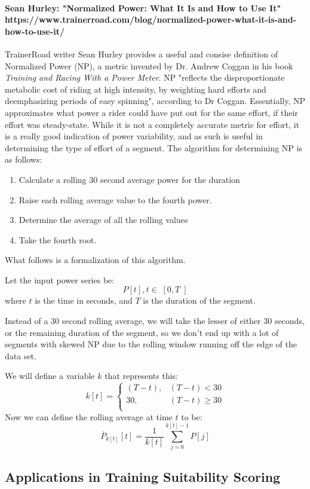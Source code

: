 \documentclass[12pt,a4paper]{article}
\begin{document}
\paragraph{Sean Hurley: "Normalized Power: What It Is and How to Use It" https://www.trainerroad.com/blog/normalized-power-what-it-is-and-how-to-use-it/}
TrainerRoad writer Sean Hurley provides a useful and consise definition of Normalized Power (NP), a metric invented by Dr. Andrew Coggan in his book \textit{Training and Racing With a Power Meter}. NP
"reflects the disproportionate metabolic cost of riding at high intensity, by weighting hard efforts and deemphasizing periods of easy spinning", according to Dr Coggan.
Essentially, NP approximates what power a rider could have put out for the same effort, if their effort was steady-state. While it is not a completely accurate metric for effort, it is a really
good indication of power variability, and as such is useful in determining the type of effort of a segment. The algorithm for determining NP is as follows:
\begin{enumerate}
	\item Calculate a rolling 30 second average power for the duration
	\item Raise each rolling average value to the fourth power.
	\item Determine the average of all the rolling values
	\item Take the fourth root.
\end{enumerate}

What follows is a formalization of this algorithm.

Let the input power series be:
\[
	P[t], t \in \;[0,T\;]
\]
where $t$ is the time in seconds, and $T$ is the duration of the segment.

Instead of a 30 second rolling average, we will take the lesser of either 30 seconds, or the remaining duration of the segment, so we don't end up
with a lot of segments with skewed NP due to the rolling window running off the edge of the data set.

We will define a variable $k$ that represents this:
\[
	k[t] = \begin{cases}
		(T-t), & (T-t) < 30   \\
		30,    & (T-t) \ge 30 \\
	\end{cases}
\]
Now we can define the rolling average at time $t$ to be:
\[
	\overline{P}_{k[t]}[t] = \frac{1}{k[t]} \sum_{j=0}^{k[t]-1} P[j]

\]
\subsection{Applications in Training Suitability Scoring}
\end{document}
